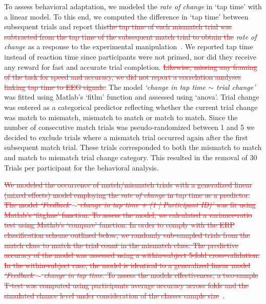To assess behavioral adaptation, \textcolor{n}{we modeled the \textit{rate of change} in `tap time' with a linear model. To this end, we computed the difference in `tap time' between subsequent trials and report this}\textcolor{red}{\st{the tap time of each mismatch trial was subtracted from the tap time of the subsequent match trial to obtain the}} \textit{rate of change} as a response to the experimental manipulation~\cite{Dutilh2012-ps}. We reported tap time instead of reaction time since participants were not primed, nor did they receive any reward for fast and accurate trial completion. \textcolor{red}{\st{Likewise, missing any framing of the task for speed and accuracy, we did not report a correlation analyses linking tap time to EEG signals.}} \textcolor{n}{The model \textit{`change in tap time $\sim$ trial change'} was fitted using Matlab's `fitlm' function and assessed using `anova'. Trial change was entered as a categorical predictor reflecting whether the current trial change was match to mismatch, mismatch to match or match to match. Since the number of consecutive match trials was pseudo-randomized between 1 and 5 we decided to exclude trials where a mismatch trial occurred again after the first subsequent match trial. These trials corresponded to both the mismatch to match and match to mismatch trial change category. This resulted in the removal of 30 Trials per participant for the behavioral analysis.}


\textcolor{red}{\st{We modeled the occurrence of match/mismatch trials with a generalized linear (mixed effects) model employing the \textit{rate of change} in tap time as a predictor. The model \textit{`Feedback $\sim$ change in tap time + (1 | Participant ID)'} was fit using Matlab's `fitglme' function. To assess the model, we calculated a variance-ratio test using Matlab's `compare' function. In order to comply with the ERP classification scheme outlined below, we randomly sub-sampled trials from the match class to match the trial count in the mismatch class. The predictive accuracy of the model was assessed using a within-subject 5-fold cross-validation. In the within-subject case, the model is identical to a generalized linear model \textit{`Feedback $\sim$ change in tap time}. To assess the models effectiveness, a two-sample T-test was computed using participants average accuracy across folds and the simulated chance level under consideration of the classes sample size}}~\cite{Muller-Putz2007-oc}.


